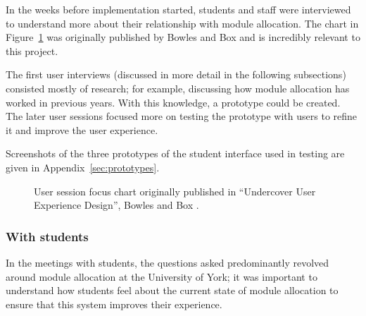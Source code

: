 \documentclass[draft]{scrartcl}
\begin{document}
In the weeks before implementation started, students and staff were
interviewed to understand more about their relationship with module
allocation. The chart in Figure~\ref{bowles_dualpurpose_chart} was originally
published by Bowles and Box and is incredibly relevant to this project.

The first user interviews (discussed in more detail in the following
subsections) consisted mostly of research; for example, discussing how module
allocation has worked in previous years. With this knowledge, a prototype
could be created. The later user sessions focused more on testing the
prototype with users to refine it and improve the user experience.

Screenshots of the three prototypes of the student interface used in testing
are given in Appendix~\ref{sec:prototypes}.

\begin{figure}
  \begin{center}
  \end{center}
  \caption{User session focus chart originally published in
    ``Undercover User Experience Design'', Bowles and Box \cite{bowles2011undercover}.}
  \label{bowles_dualpurpose_chart}
\end{figure}

\subsubsection{With students}

In the meetings with students, the questions asked predominantly revolved
around module allocation at the University of York; it was important to
understand how students feel about the current state of module allocation to
ensure that this system improves their experience.
\end{document}

